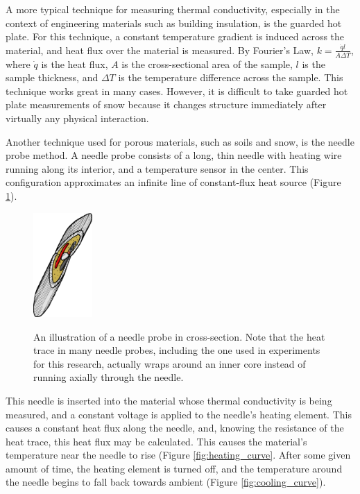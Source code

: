 A more typical technique for measuring thermal conductivity, especially in the
context of engineering materials such as building insulation, is the guarded
hot plate. For this technique, a constant temperature gradient is induced across
the material, and heat flux over the material is measured.  By Fourier's Law,
\(k = \frac{\dot{q}l}{A\Delta T}\), where \(\dot{q}\) is the heat flux, \(A\) is
the cross-sectional area of the sample, \(l\) is the sample thickness, and 
\(\Delta T\) is the temperature difference across the sample. This technique
works great in many cases. However, it is difficult to take guarded hot plate
measurements of snow because it changes structure immediately after virtually
any physical interaction.

Another technique used for porous materials, such as soils and snow, is the
needle probe method. A needle probe consists of a long, thin needle with heating
wire running along its interior, and a temperature sensor in the center. This
configuration approximates an infinite line of constant-flux heat source
(Figure \ref{fig:needle_xsect}). \cite{basictheory}

\begin{figure}[h]
\centering
\includegraphics[width=0.2\textwidth]{fig/needle_xsect.png}
\label{fig:needle_xsect}
\caption{An illustration of a needle probe in cross-section. Note that the heat
trace in many needle probes, including the one used in experiments for this
research, actually wraps around an inner core instead of running axially through
the needle.}
\end{figure}

This needle is inserted into the material whose thermal conductivity is being
measured, and a constant voltage is applied to the needle's heating element.
This causes a constant heat flux along the needle, and, knowing the resistance
of the heat trace, this heat flux may be calculated. This causes the material's
temperature near the needle to rise (Figure \ref{fig:heating_curve}. After some
given amount of time, the heating element is turned off, and the temperature
around the needle begins to fall back towards ambient (Figure \ref{fig:cooling_curve}).


